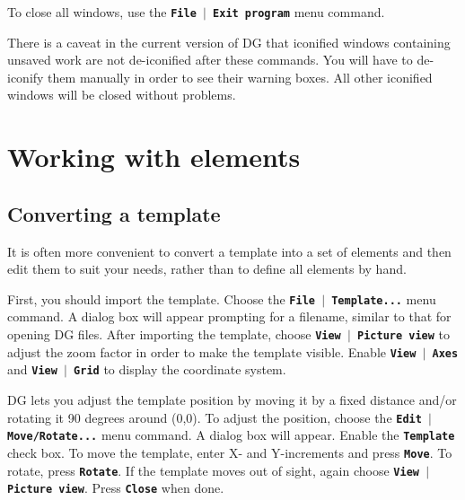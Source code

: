 \documentclass[12pt]{report}
\begin{document}
To close all windows, use the
\textbf{\texttt{File  \begin{math}\vert{}\end{math}  Exit program}} menu
command.

There is a caveat in the current version of DG that iconified windows
containing unsaved work are not de-iconified after these commands. You
will have to de-iconify them manually in order to see their warning
boxes. All other iconified windows will be closed without problems.

\chapter{Working with elements}
\section{Converting a template}

It is often more convenient to convert a template into a set of
elements and then edit them to suit your needs, rather than to define
all elements by hand.

First, you should import the template. Choose the
\textbf{\texttt{File  \begin{math}\vert{}\end{math}  Template...}} menu
command. A dialog box will appear prompting for a filename, similar to
that for opening DG files. After importing the template, choose
\textbf{\texttt{View  \begin{math}\vert{}\end{math}  Picture view}} to
adjust the zoom factor in order to make the template visible. Enable
\textbf{\texttt{View \begin{math}\vert{}\end{math} Axes}} and
\textbf{\texttt{View \begin{math}\vert{}\end{math} Grid}} to display the
coordinate system.

DG lets you adjust the template position by moving it by a fixed
distance and/or rotating it 90 degrees around (0,0). To adjust the
position, choose the
\textbf{\texttt{Edit \begin{math}\vert{}\end{math} Move/Rotate...}} menu
command. A dialog box will appear. Enable the
\textbf{\texttt{Template}} check box. To move the template, enter X-
and Y-increments and press \textbf{\texttt{Move}}. To rotate, press
\textbf{\texttt{Rotate}}. If the template moves out of sight, again
choose \textbf{\texttt{View \begin{math}\vert{}\end{math} Picture view}}.
Press \textbf{\texttt{Close}} when done.
\end{document}
